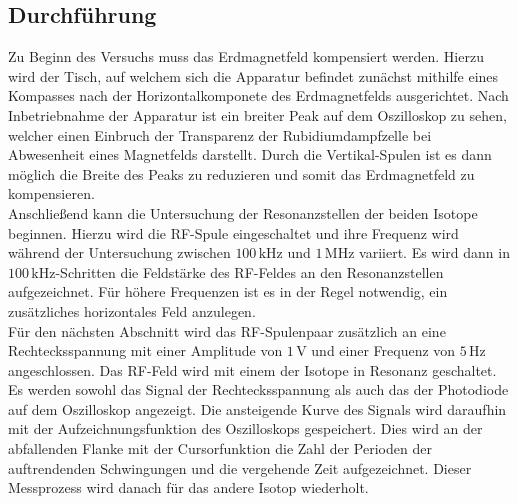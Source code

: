 \subsection{Durchführung}
Zu Beginn des Versuchs muss das Erdmagnetfeld kompensiert werden. Hierzu wird der Tisch, auf welchem sich die Apparatur befindet zunächst mithilfe eines Kompasses nach der Horizontalkomponete des Erdmagnetfelds ausgerichtet. Nach Inbetriebnahme der Apparatur ist ein breiter Peak auf dem Oszilloskop zu sehen, welcher einen Einbruch der Transparenz der Rubidiumdampfzelle bei Abwesenheit eines Magnetfelds darstellt. Durch die Vertikal-Spulen ist es dann möglich die Breite des Peaks zu reduzieren und somit das Erdmagnetfeld zu kompensieren.\\
Anschließend kann die Untersuchung der Resonanzstellen der beiden Isotope beginnen. Hierzu wird die RF-Spule eingeschaltet und ihre Frequenz wird während der Untersuchung zwischen $100\, \si{\kilo\hertz}$ und $1\,\si{\mega\hertz}$ variiert. Es wird dann in $100\, \si{\kilo\hertz}$-Schritten die Feldstärke des RF-Feldes an den Resonanzstellen aufgezeichnet. Für höhere Frequenzen ist es in der Regel notwendig, ein zusätzliches horizontales Feld anzulegen.\\
Für den nächsten Abschnitt wird das RF-Spulenpaar zusätzlich an eine Rechtecksspannung mit einer Amplitude von $1\,\si{\volt}$ und einer Frequenz von $5\,\si{\hertz}$ angeschlossen. Das RF-Feld wird mit einem der Isotope in Resonanz geschaltet. Es werden sowohl das Signal der Rechtecksspannung als auch das der Photodiode auf dem Oszilloskop angezeigt. Die ansteigende Kurve des Signals wird daraufhin mit der Aufzeichnungsfunktion des Oszilloskops gespeichert. Dies wird an der abfallenden Flanke mit der Cursorfunktion die Zahl der Perioden der auftrendenden Schwingungen und die vergehende Zeit aufgezeichnet. Dieser Messprozess wird danach für das andere Isotop wiederholt.
\clearpage

